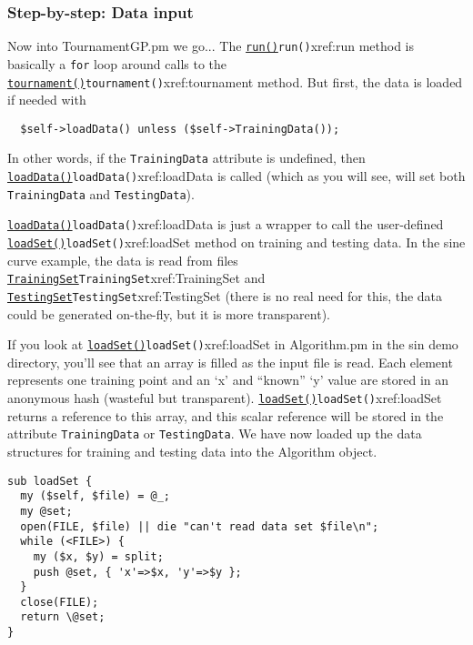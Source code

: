 \documentclass[a4paper]{article}
\begin{document}
\subsubsection{Step-by-step: Data input}

Now into TournamentGP.pm we go...  The \hyperref[no]{\texttt{run()}}{\texttt{run()}}{xref:run} method
is basically a \texttt{for} loop around calls to the
\hyperref[no]{\texttt{tournament()}}{\texttt{tournament()}}{xref:tournament} method.  But first, the data is loaded
if needed with

\begin{verbatim}
  $self->loadData() unless ($self->TrainingData());
\end{verbatim}

In other words, if the \texttt{TrainingData} attribute is undefined,
then \hyperref[no]{\texttt{loadData()}}{\texttt{loadData()}}{xref:loadData} is called (which as you will see, will set
both \texttt{TrainingData} and \texttt{TestingData}).

\hyperref[no]{\texttt{loadData()}}{\texttt{loadData()}}{xref:loadData} is just a wrapper to call the user-defined
\hyperref[no]{\texttt{loadSet()}}{\texttt{loadSet()}}{xref:loadSet} method on training and testing data.  In the sine
curve example, the data is read from files \hyperref[no]{\texttt{TrainingSet}}{\texttt{TrainingSet}}{xref:TrainingSet} and
\hyperref[no]{\texttt{TestingSet}}{\texttt{TestingSet}}{xref:TestingSet} (there is no real need for this, the data could be
generated on-the-fly, but it is more transparent).

If you look at \hyperref[no]{\texttt{loadSet()}}{\texttt{loadSet()}}{xref:loadSet} in Algorithm.pm in the sin demo
directory, you'll see that an array is filled as the input file is
read.  Each element represents one training point and an `x' and
``known'' `y' value are stored in an anonymous hash (wasteful but
transparent).  \hyperref[no]{\texttt{loadSet()}}{\texttt{loadSet()}}{xref:loadSet} returns a reference to this array,
and this scalar reference will be stored in the attribute
\texttt{TrainingData} or \texttt{TestingData}.  We have now loaded up
the data structures for training and testing data into the Algorithm
object.

\begin{verbatim}
sub loadSet {
  my ($self, $file) = @_;
  my @set;
  open(FILE, $file) || die "can't read data set $file\n";
  while (<FILE>) {
    my ($x, $y) = split;
    push @set, { 'x'=>$x, 'y'=>$y };
  }
  close(FILE);
  return \@set;
}
\end{verbatim}
\end{document}
